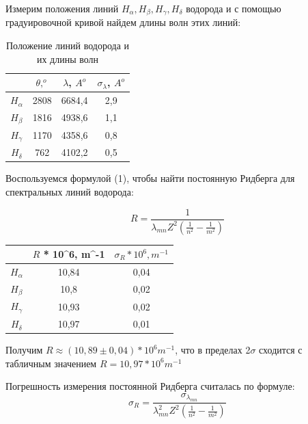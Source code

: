 \documentclass[a4paper,12pt]{report}
\begin{document}
Измерим положения линий $H_{\alpha},H_{\beta},H_{\gamma}, H_{\delta}$ водорода и с помощью градуировочной кривой найдем длины волн этих линий:

\begin{table}[H]
\begin{tabular}{|c|c|c|c|}
\hline
             & $\theta, ^{o}$ & $\lambda$, $A^{o}$ & $\sigma_{\lambda}$, $A^{o}$ \\ \hline
$H_{\alpha}$ & 2808  & 6684,4 & 2,9               \\ \hline
$H_{\beta}$ & 1816  & 4938,6 & 1,1               \\ \hline
$H_{\gamma}$ & 1170  & 4358,6 & 0,8               \\ \hline
$H_{\delta}$ & 762   & 4102,2 & 0,5               \\ \hline
\end{tabular}
\caption{Положение линий водорода и их длины волн}
\end{table}

Воспользуемся формулой (1), чтобы найти постоянную Ридберга для спектральных линий водорода:

\begin{equation*}
    R = \frac{1}{\lambda_{mn}Z^{2}(\frac{1}{n^{2}} - \frac{1}{m^{2}})}
\end{equation*}

\begin{table}[H]
\begin{tabular}{|c|c|c|}
\hline
             & $R$ * 10^{6}, m^{-1}     & $\sigma_{R}*10^{6}, m^{-1} $ \\ \hline
$H_{\alpha}$ & 10,84 & 0,04    \\ \hline
$H_{\beta}$ & 10,8  & 0,02    \\ \hline
$H_{\gamma}$ & 10,93 & 0,02    \\ \hline
$H_{\delta}$ & 10,97 & 0,01    \\ \hline
\end{tabular}
\end{table}

Получим $R \approx (10,89 \pm 0,04) * 10^{6} m^{-1}$, что в пределах 2$\sigma$ сходится с табличным значением $R =  10,97 * 10^{6} m^{-1}$

Погрешность измерения постоянной Ридберга считалась по формуле:
\begin{equation*}
    \sigma_{R} = \frac{\sigma_{\lambda_{mn}}}{\lambda_{mn}^{2}Z^{2}(\frac{1}{n^{2}} - \frac{1}{m^{2}})}
\end{equation*}
\end{document}
